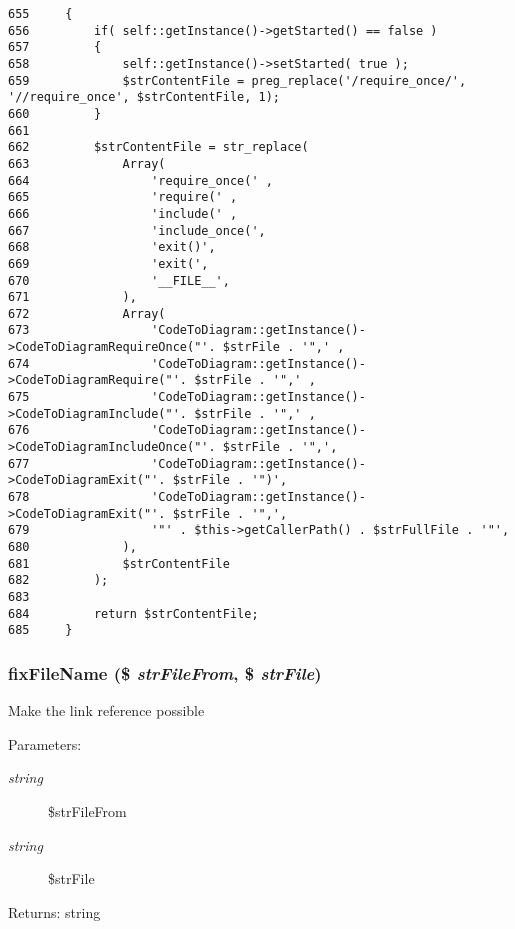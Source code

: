\begin{Code}\begin{verbatim}655     {
656         if( self::getInstance()->getStarted() == false )
657         {
658             self::getInstance()->setStarted( true );
659             $strContentFile = preg_replace('/require_once/', '//require_once', $strContentFile, 1);
660         }
661 
662         $strContentFile = str_replace(
663             Array(
664                 'require_once(' ,
665                 'require(' ,
666                 'include(' ,
667                 'include_once(',
668                 'exit()',
669                 'exit(',
670                 '__FILE__',
671             ),
672             Array(
673                 'CodeToDiagram::getInstance()->CodeToDiagramRequireOnce("'. $strFile . '",' ,
674                 'CodeToDiagram::getInstance()->CodeToDiagramRequire("'. $strFile . '",' ,
675                 'CodeToDiagram::getInstance()->CodeToDiagramInclude("'. $strFile . '",' ,
676                 'CodeToDiagram::getInstance()->CodeToDiagramIncludeOnce("'. $strFile . '",',
677                 'CodeToDiagram::getInstance()->CodeToDiagramExit("'. $strFile . '")',
678                 'CodeToDiagram::getInstance()->CodeToDiagramExit("'. $strFile . '",',
679                 '"' . $this->getCallerPath() . $strFullFile . '"',
680             ),
681             $strContentFile
682         );
683 
684         return $strContentFile;
685     }
\end{verbatim}
\end{Code}


\hypertarget{class_code_to_diagram_ba72ffc8b4aeabbd33a7206c395ede18}{
\subsubsection[{fixFileName}]{\setlength{\rightskip}{0pt plus 5cm}fixFileName (\$ {\em strFileFrom}, \/  \$ {\em strFile})}}
\label{class_code_to_diagram_ba72ffc8b4aeabbd33a7206c395ede18}


Make the link reference possible

\begin{Desc}
\item[Parameters:]
\begin{description}
\item[{\em string}]\$strFileFrom \item[{\em string}]\$strFile \end{description}
\end{Desc}
\begin{Desc}
\item[Returns:]string \end{Desc}


